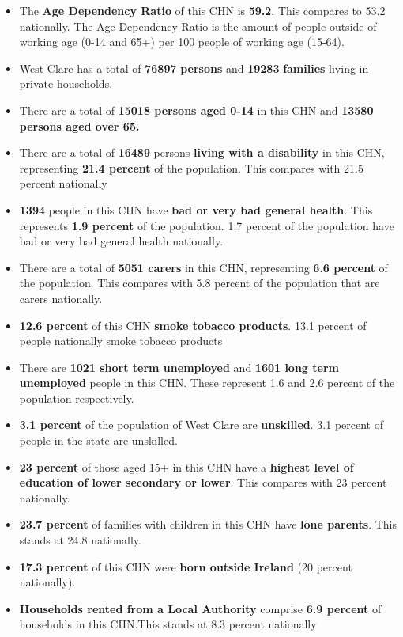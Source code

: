\documentclass{article}
\begin{document}
\begin{itemize}

\item The \textbf{Age Dependency Ratio} of this CHN is  \textbf{59.2}. This compares to 53.2 nationally. The Age Dependency Ratio is the amount of people outside of working age (0-14 and 65+) per 100 people of working age (15-64). 

\item West Clare has a total of \textbf{\num{76897}} \textbf{persons} and  \textbf{\num{19283}} \textbf{families} living in private households.

\item There are a total of \textbf{\num{15018} persons aged 0-14} in this CHN and \textbf{\num{13580} persons aged over 65.} 

\item There are a total of \textbf{\num{16489}} persons \textbf{living with a disability} in this CHN, representing \textbf{21.4 percent} of the population. This compares with  21.5 percent nationally

\item \textbf{\num{1394}} people in this CHN have \textbf{bad or very bad general health}. This represents \textbf{1.9 percent} of the population. 1.7 percent of the population have bad or very bad general health nationally. 

\item There are a total of \textbf{\num{5051} carers} in this CHN, representing \textbf{6.6 percent} of the population. This compares with 5.8 percent of the population that are carers nationally. 

\item \textbf{12.6 percent} of this CHN \textbf{smoke tobacco products}. 13.1 percent of people nationally smoke tobacco products

\item There are \textbf{\num{1021} short term unemployed} and \textbf{\num{1601} long term unemployed} people in this CHN. These represent 1.6 and 2.6 percent of the population respectively.

\item  \textbf{3.1 percent} of the population of West Clare are \textbf{unskilled}. 3.1 percent of people in the state are unskilled.

\item \textbf{23 percent} of those aged 15+ in this CHN have a \textbf{highest level of education of lower secondary or lower}. This compares with 23 percent nationally. 

\item \textbf{23.7 percent} of families with children in this CHN have \textbf{lone parents}. This stands at 24.8 nationally.

\item \textbf{17.3 percent} of this CHN were \textbf{born outside Ireland} (20 percent nationally).

\item \textbf{Households rented from a Local Authority} comprise \textbf{6.9 percent} of households in this CHN.This stands at 8.3 percent nationally

\end{itemize}
\end{document}
